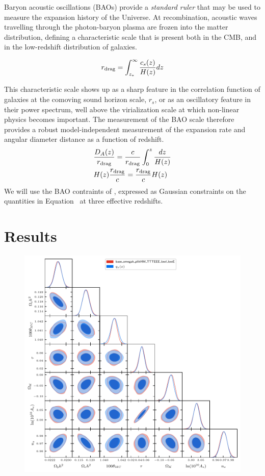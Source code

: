 \documentclass[fleqn,usenatbib]{mnras}
\begin{document}
Baryon acoustic oscillations (BAOs) provide a \emph{standard ruler} that may be used to measure the expansion history of the Universe. At recombination, acoustic waves travelling through the photon-baryon plasma are frozen into the matter distribution, defining a characteristic scale that is present both in the CMB, and in the low-redshift distribution of galaxies.

\begin{equation}
    r_{\rm drag} = \int_{z_*}^\infty \frac{c_s(z)}{H(z)} dz
\end{equation}

This characteristic scale shows up as a sharp feature in the correlation function of galaxies at the comoving sound horizon scale, $r_s$, or as an oscillatory feature in their power spectrum, well above the virialization scale at which non-linear physics becomes important. The measurement of the BAO scale therefore provides a robust model-independent measurement of the expansion rate and angular diameter distance as a function of redshift. 
\begin{equation}
\begin{aligned}
    &\frac{D_A(z)}{r_{\rm drag}} = \frac{c}{r_{\rm drag}}\int_0^z \frac{dz}{H(z)} \\
    &H(z)\frac{r_{\rm drag}}{c} = \frac{r_{\rm drag}}{c}H(z)
\end{aligned}
\end{equation}
We will use the BAO contraints of \cite{alam/etal:2017}, expressed as Gaussian constraints on the quantities in Equation~ at three effective redshifts.




\section{Results}

\begin{figure}
\includegraphics[]{./results/densities/corner.pdf}
\end{figure}
\end{document}
